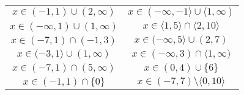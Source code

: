 \documentclass[a4paper,12pt,leqno,fleqn]{article}
\begin{document}
\begin{tabularx}{\linewidth}{@{}XX@{}}

  \begin{equation}
    x\in(-1,1)\cup(2,\infty)
  \end{equation}
&
  \begin{equation}
    x\in(-\infty,-1\rangle\cup\langle1,\infty)
  \end{equation}
\\
  \begin{equation}
    x\in(-\infty,1)\cup(1,\infty)
  \end{equation}
&
  \begin{equation}
    x\in\langle1,5\rangle\cap\langle2,10\rangle
  \end{equation}
\\
  \begin{equation}
    x\in(-7,1)\cap(-1,3)
  \end{equation}
&
  \begin{equation}
    x\in(-\infty,5\rangle\cup(2,7)
  \end{equation}
\\
  \begin{equation}
    x\in(-3,1\rangle\cup(1,\infty)
  \end{equation}
&
  \begin{equation}
    x\in(-\infty,3)\cap\langle1,\infty)
  \end{equation}
\\
  \begin{equation}
    x\in(-7,1)\cap(5,\infty)
  \end{equation}
&
  \begin{equation}
    x\in(0,4)\cup\{6\}
  \end{equation}
\\
  \begin{equation}
    x\in(-1,1)\cap\{0\}
  \end{equation}
&
  \begin{equation}
    x\in(-7,7)\setminus\langle0,10\rangle
  \end{equation}
\\
\end{tabularx}
\end{document}
